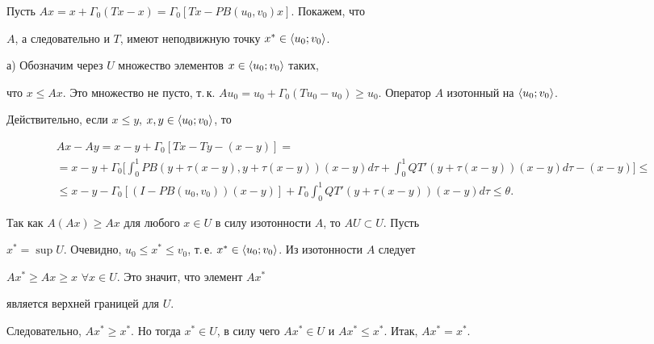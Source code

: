  


\begin{pf} 


Пусть $Ax=x+\Gamma_0(T x-x)=\Gamma_0[T x-P B(u_0,v_0)x]$. Покажем, что 


$A$, а следовательно и $T$, имеют неподвижную точку $x^*\in\la 


u_0;v_0\ra$. 


 


а) Обозначим через $U$ множество элементов $x\in\langle u_0;v_0\rangle$ таких, 


что $x\le Ax$. Это множество не пусто, т.\,к. $A u_0=u_0+\Gamma_0(T 


u_0-u_0)\ge u_0$. Оператор $A$ изотонный на $\la u_0;v_0\ra$. 


Действительно, если $x\le y$, $x,y\in\langle u_0;v_0\rangle$, то 


\begin{multline*} 


Ax-A y=x-y+\Gamma_0[T x-T y-(x-y)]=\\ 


% 


=x-y+\Gamma_0\bigg[\int^1_0 P B(y+\tau(x-y), 


y+\tau(x-y))(x-y)d\tau+\int^1_0 Q T'(y+\tau(x-y)) 


(x-y)d\tau-(x-y)\bigg]\le \\ 


% 


\le x-y-\Gamma_0[(I-P B(u_0,v_0))(x-y)]+\Gamma_0\int^1_0 


Q T'(y+\tau(x-y))(x-y)d\tau\le\theta. 


\end{multline*} 


 


Так как $A(Ax)\ge Ax$ для любого $x\in U$ в силу изотонности $A$, то $A 


U\subset U$. Пусть 


$x^*=\sup U$. Очевидно, $u_0\le x^*\le v_0$, т.\,е. $x^*\in\la 


u_0;v_0\ra$. Из изотонности $A$ следует 


$Ax^*\ge Ax\ge x$ $\forall x\in U$. Это значит, что элемент $Ax^*$ 


является верхней границей для $U$. 


Следовательно, $Ax^*\ge x^*$. Но тогда $x^*\in U$, в силу чего $Ax^*\in 


U$ и $Ax^*\le x^*$. Итак, $Ax^*=x^*$. 



\end{pf}
